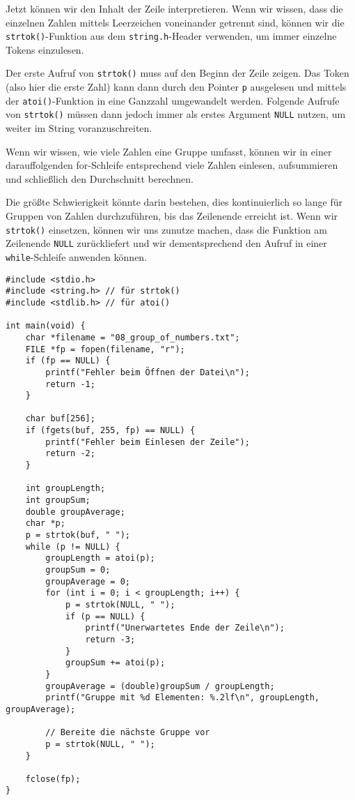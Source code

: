 Jetzt können wir den Inhalt der Zeile interpretieren. Wenn wir wissen, dass die
einzelnen Zahlen mittels Leerzeichen voneinander getrennt sind, können wir die
\texttt{strtok()}-Funktion aus dem \texttt{string.h}-Header
verwenden, um immer einzelne Tokens einzulesen.

Der erste Aufruf von \texttt{strtok()} muss auf den Beginn der Zeile
zeigen. Das Token (also hier die erste Zahl) kann dann durch den Pointer
\texttt{p} ausgelesen und mittels der \texttt{atoi()}-Funktion in
eine Ganzzahl umgewandelt werden. Folgende Aufrufe von \texttt{strtok()}
müssen dann jedoch immer als erstes Argument \texttt{NULL} nutzen, um
weiter im String voranzuschreiten.

Wenn wir wissen, wie viele Zahlen eine Gruppe umfasst, können wir in einer
darauffolgenden for-Schleife entsprechend viele Zahlen einlesen, aufsummieren
und schließlich den Durchschnitt berechnen.

Die größte Schwierigkeit könnte darin bestehen, dies kontinuierlich so lange für
Gruppen von Zahlen durchzuführen, bis das Zeilenende erreicht ist. Wenn wir
\texttt{strtok()} einsetzen, können wir uns zunutze machen, dass die
Funktion am Zeilenende \texttt{NULL} zurückliefert und wir
dementsprechend den Aufruf in einer \texttt{while}-Schleife anwenden
können.

\begin{verbatim}
#include <stdio.h>
#include <string.h> // für strtok()
#include <stdlib.h> // für atoi()

int main(void) {
    char *filename = "08_group_of_numbers.txt";
    FILE *fp = fopen(filename, "r");
    if (fp == NULL) {
        printf("Fehler beim Öffnen der Datei\n");
        return -1;
    }

    char buf[256];
    if (fgets(buf, 255, fp) == NULL) {
        printf("Fehler beim Einlesen der Zeile");
        return -2;
    }

    int groupLength;
    int groupSum;
    double groupAverage;
    char *p;
    p = strtok(buf, " ");
    while (p != NULL) {
        groupLength = atoi(p);
        groupSum = 0;
        groupAverage = 0;
        for (int i = 0; i < groupLength; i++) {
            p = strtok(NULL, " ");
            if (p == NULL) {
                printf("Unerwartetes Ende der Zeile\n");
                return -3;
            }
            groupSum += atoi(p);
        }
        groupAverage = (double)groupSum / groupLength;
        printf("Gruppe mit %d Elementen: %.2lf\n", groupLength, groupAverage);

        // Bereite die nächste Gruppe vor
        p = strtok(NULL, " ");
    }

    fclose(fp);
}
\end{verbatim}


